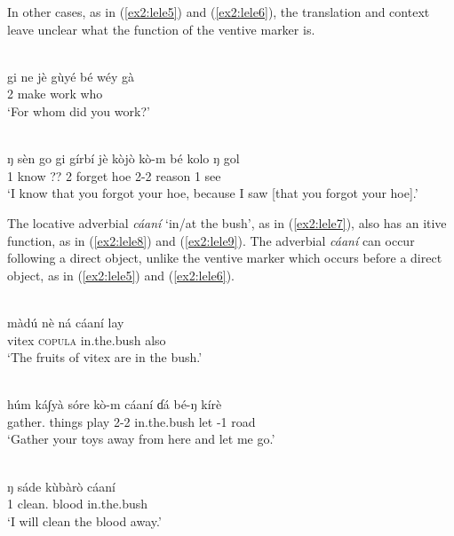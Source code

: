 In other cases, as in (\ref{ex2:lele5}) and (\ref{ex2:lele6}), the translation and context leave unclear what the function of the ventive marker is. 

\ea\label{ex2:lele5}
 \\
\gll gi	ne	jè	gùyé	bé	wéy	gà \\
2	make		work		who	 \\
\glt `For whom did you work?'

\ex\label{ex2:lele6}
 \\
\gll ŋ	sèn	go	gi	gírbí	jè	kòjò	kò-m	bé	kolo	ŋ	gol \\
1	know	??	2	forget		hoe	2-2		reason	1	see \\
\glt `I know that you forgot your hoe, because I saw [that you forgot your hoe].'
\z 

The locative adverbial \textit{cáaní} ‘in/at the bush’, as in (\ref{ex2:lele7}), also has an itive function, as in (\ref{ex2:lele8}) and (\ref{ex2:lele9}). The adverbial \textit{cáaní} can occur following a direct object, unlike the ventive marker which occurs before a direct object, as in (\ref{ex2:lele5}) and (\ref{ex2:lele6}). 

\ea\label{ex2:lele7}
 \\
\gll màdú	nè	ná	cáaní	lay \\
vitex	\textsc{copula}		in.the.bush	also \\
\glt `The fruits of vitex are in the bush.'

\ex\label{ex2:lele8}
 \\
\gll húm	ká∫yà	sóre	kò-m	cáaní	ɗá	bé-ŋ	kírè \\
gather.	things	play	2-2	in.the.bush	let	-1	road \\
\glt `Gather your toys away from here and let me go.'

\ex\label{ex2:lele9}
 \\
\gll ŋ	sáde	kùbàrò	cáaní \\
1	clean.	blood	in.the.bush \\
\glt `I will clean the blood away.'
\z 

